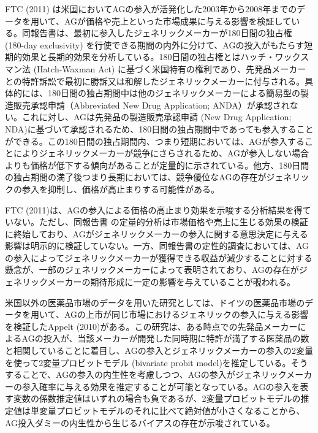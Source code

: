 \documentclass[a4j,10.5pt]{jarticle}
\begin{document}
FTC (2011) は米国においてAGの参入が活発化した2003年から2008年までのデータを用いて、AGが価格や売上といった市場成果に与える影響を検証している。同報告書は、最初に参入したジェネリックメーカーが180日間の独占権 (180-day exclusivity) を行使できる期間の内外に分けて、AGの投入がもたらす短期的効果と長期的効果を分析している。180日間の独占権とはハッチ・ワックスマン法 (Hatch-Waxman Act) に基づく米国特有の権利であり、先発品メーカーとの特許訴訟で最初に勝訴又は和解したジェネリックメーカーに付与される。具体的には、180日間の独占期間中は他のジェネリックメーカーによる簡易型の製造販売承認申請（Abbreviated New Drug Application; ANDA）が承認されない。これに対し、AGは先発品の製造販売承認申請 (New Drug Application; NDA)に基づいて承認されるため、180日間の独占期間中であっても参入することができる。この180日間の独占期間内、つまり短期においては、AGが参入することによりジェネリックメーカーが競争にさらされるため、AGが参入しない場合よりも価格が低下する傾向があることが定量的に示されている。他方、180日間の独占期間の満了後つまり長期においては、競争優位なAGの存在がジェネリックの参入を抑制し、価格が高止まりする可能性がある。\par
FTC (2011)は、AGの参入による価格の高止まり効果を示唆する分析結果を得ていない。ただし、同報告書 の定量的分析は市場価格や売上に生じる効果の検証に終始しており、AGがジェネリックメーカーの参入に関する意思決定に与える影響は明示的に検証していない。一方、同報告書の定性的調査においては、AGの参入によってジェネリックメーカーが獲得できる収益が減少することに対する懸念が、一部のジェネリックメーカーによって表明されており、AGの存在がジェネリックメーカーの期待形成に一定の影響を与えていることが覗われる。\par
米国以外の医薬品市場のデータを用いた研究としては、ドイツの医薬品市場のデータを用いて、AGの上市が同じ市場におけるジェネリックの参入に与える影響を検証したAppelt (2010)がある。この研究は、ある時点での先発品メーカーによるAGの投入が、当該メーカーが開発した同時期に特許が満了する医薬品の数と相関していることに着目し、AGの参入とジェネリックメーカーの参入の2変量を使って2変量プロビットモデル (bivariate probit model)を推定している。そうすることで、AGの参入の内生性を考慮しつつ、AGの参入がジェネリックメーカーの参入確率に与える効果を推定することが可能となっている。AGの参入を表す変数の係数推定値はいずれの場合も負であるが、2変量プロビットモデルの推定値は単変量プロビットモデルのそれに比べて絶対値が小さくなることから、AG投入ダミーの内生性から生じるバイアスの存在が示唆されている。\par
\end{document}
